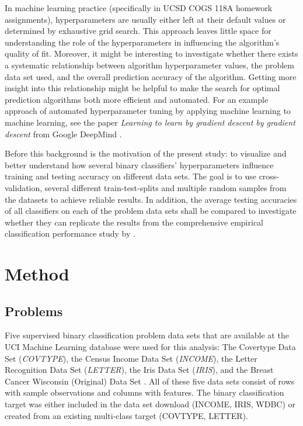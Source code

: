 \documentclass[twoside,11pt]{article}
\begin{document}
		In machine learning practice (specifically in UCSD COGS 118A homework assignments), hyperparameters are usually either left at their default values or determined by exhaustive grid search. This approach leaves little space for understanding the role of the hyperparameters in influencing the algorithm's quality of fit. Moreover, it might be interesting to investigate whether there exists a systematic relationship between algorithm hyperparameter values, the problem data set used, and the overall prediction accuracy of the algorithm. Getting more insight into this relationship might be helpful to make the search for optimal prediction algorithms both more efficient and automated. For an example approach of automated hyperparameter tuning by applying machine learning to machine learning, see the paper \textit{Learning to learn by gradient descent by gradient descent} from Google DeepMind \citep{andrychowicz_learning_2016}.
		
		Before this background is the motivation of the present study: to visualize and better understand how several binary classifiers' hyperparameters influence training and testing accuracy on different data sets. The goal is to use cross-validation, several different train-test-splits and multiple random samples from the datasets to achieve reliable results. In addition, the average testing accuracies of all classifiers on each of the problem data sets shall be compared to investigate whether they can replicate the results from the comprehensive empirical classification performance study by \cite{caruana_empirical_2006}.
	
	\section{Method}
		\subsection{Problems}
			Five supervised binary classification problem data sets that are available at the UCI Machine Learning database \citep{dheeru_uci_2017} were used for this analysis: The Covertype Data Set (\textit{COVTYPE}), the Census Income Data Set (\textit{INCOME}), the Letter Recognition Data Set (\textit{LETTER}), the Iris Data Set (\textit{IRIS}), and the Breast Cancer Wisconsin (Original) Data Set \citep[\textit{WDBC},][]{mangasarian_cancer_1990}. All of these five data sets consist of rows with sample observations and columns with features. The binary classification target was either included in the data set download (INCOME, IRIS, WDBC) or created from an existing multi-class target (COVTYPE, LETTER).
			
\end{document}
